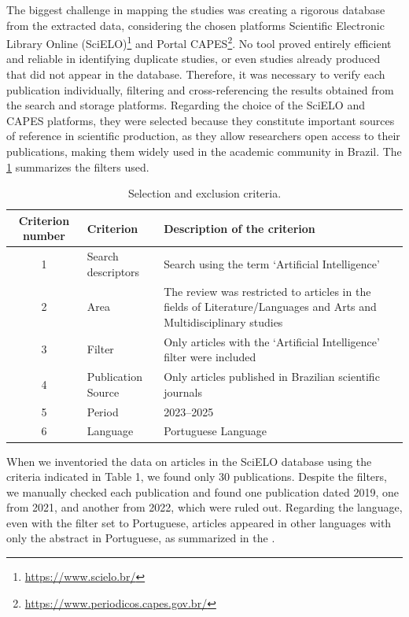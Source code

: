 \documentclass[english]{textolivre}
\begin{document}
The biggest challenge in mapping the studies was creating a rigorous database from the extracted data, considering the chosen platforms Scientific Electronic Library Online (SciELO)\footnote{\url{https://www.scielo.br/}} and Portal CAPES\footnote{\url{https://www.periodicos.capes.gov.br/}}. No tool proved entirely efficient and reliable in identifying duplicate studies, or even studies already produced that did not appear in the database. Therefore, it was necessary to verify each publication individually, filtering and cross-referencing the results obtained from the search and storage platforms. Regarding the choice of the SciELO and CAPES platforms, they were selected because they constitute important sources of reference in scientific production, as they allow researchers open access to their publications, making them widely used in the academic community in Brazil. The \cref{tab1} summarizes the filters used.

\begin{table}[htbp]
\centering
\caption{Selection and exclusion criteria.}
\label{tab1}
\begin{threeparttable}
\begin{tabular}{clp{8cm}}
\hline
Criterion number & Criterion & Description of the criterion \\
\hline
1 & Search descriptors & Search using the term `Artificial Intelligence' \\
2 & Area & The review was restricted to articles in the fields of Literature/Languages and Arts and Multidisciplinary studies \\
3 & Filter & Only articles with the `Artificial Intelligence' filter were included \\
4 & Publication Source & Only articles published in Brazilian scientific journals \\
5 & Period & 2023--2025 \\
6 & Language & Portuguese Language \\
\hline
\end{tabular}
\end{threeparttable}
\end{table}

When we inventoried the data on articles in the SciELO database using the criteria indicated in Table 1, we found only 30 publications. Despite the filters, we manually checked each publication and found one publication dated 2019, one from 2021, and another from 2022, which were ruled out. Regarding the language, even with the filter set to Portuguese, articles appeared in other languages with only the abstract in Portuguese, as summarized in the .
\end{document}

